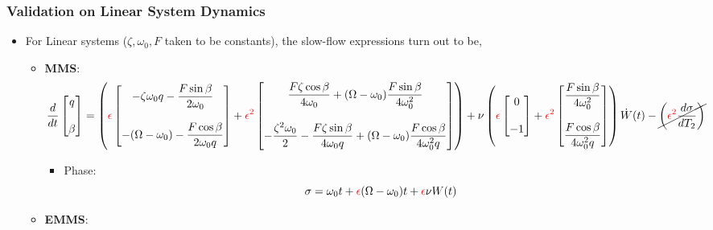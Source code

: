 \documentclass[11pt]{article}
\begin{document}
\subsubsection{Validation on Linear System Dynamics}
\label{sec:org57fbe50}
\begin{itemize}
\item For Linear systems (\(\zeta, \omega_0, F\) taken to be constants), the slow-flow expressions turn out to be,
\begin{itemize}
\item \textbf{MMS}:
\begin{align*}
  \dfrac{d}{dt} \begin{bmatrix} q\\\\\beta \end{bmatrix} =
  \left(\textcolor{red}{\epsilon} \begin{bmatrix} -\zeta \omega_0 q - \dfrac{F\sin
    \beta}{2\omega_0}\\\\-(\Omega-\omega_0)-\dfrac{F\cos \beta}{2\omega_0q} \end{bmatrix} +
  \textcolor{red}{\epsilon^2} \begin{bmatrix}\dfrac{F\zeta \cos \beta}{4\omega_0} +
    (\Omega-\omega_0)\dfrac{F\sin \beta}{4\omega_0^2}\\\\ -\dfrac{\zeta^2\omega_0}{2} - \dfrac{F\zeta\sin
    \beta}{4\omega_0q} + (\Omega-\omega_0)\dfrac{F\cos \beta}{4\omega_0^2q} \end{bmatrix}\right) +
  \nu \left(\textcolor{red}{\epsilon} \begin{bmatrix}0\\\\ -1\end{bmatrix} +
  \textcolor{red}{\epsilon^2} \begin{bmatrix}\dfrac{F\sin \beta}{4\omega_0^2}\\\\
    \dfrac{F\cos \beta}{4\omega_0^2q}\end{bmatrix}\right) \dot{W}(t) -
  \cancel{\left(\textcolor{red}{\epsilon^2} \frac{d\sigma}{dT_2}\right)}
\end{align*}
\begin{itemize}
\item Phase:
$$ \sigma = \omega_0 t + \textcolor{red}{\epsilon}(\Omega-\omega_0)t + \textcolor{red}{\epsilon} \nu W(t) $$
\end{itemize}
\item \textbf{EMMS}:

\end{itemize}
\end{itemize}
\end{document}
